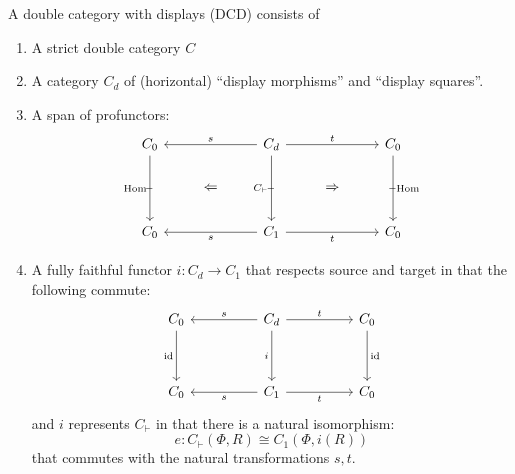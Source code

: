 \documentclass{llncs}
\begin{document}
\begin{definition}
  A double category with displays (DCD) consists of
  \begin{enumerate}
  \item A strict double category $C$
  \item A category $C_d$ of (horizontal) ``display morphisms'' and ``display squares''.
  \item A span of profunctors:
\[\begin{tikzcd}
	{C_0} && {C_d} && {C_0} \\
	& \Leftarrow && \Rightarrow \\
	{C_0} && {C_1} && {C_0}
	\arrow["{C_\vdash}"', "\shortmid"{marking}, from=1-3, to=3-3]
	\arrow["{\textrm{Hom}}", "\shortmid"{marking}, from=1-5, to=3-5]
	\arrow["{\textrm{Hom}}"', "\shortmid"{marking}, from=1-1, to=3-1]
	\arrow["s"', from=1-3, to=1-1]
	\arrow["t", from=1-3, to=1-5]
	\arrow["t"', from=3-3, to=3-5]
	\arrow["s", from=3-3, to=3-1]
\end{tikzcd}\]
\item A fully faithful functor $i : C_d \to C_1$ that respects source and target in that the following commute:
\[\begin{tikzcd}
	{C_0} && {C_d} && {C_0} \\
	\\
	{C_0} && {C_1} && {C_0}
	\arrow["i"', from=1-3, to=3-3]
	\arrow["\id", from=1-5, to=3-5]
	\arrow["\id"', from=1-1, to=3-1]
	\arrow["s"', from=1-3, to=1-1]
	\arrow["t", from=1-3, to=1-5]
	\arrow["t"', from=3-3, to=3-5]
	\arrow["s", from=3-3, to=3-1]
\end{tikzcd}\]
and $i$ represents $C_\vdash$ in that there is a natural isomorphism:
    \[ e : C_\vdash(\Phi, R) \cong C_1(\Phi, i(R)) \]
    that commutes with the natural transformations $s,t$.
  \end{enumerate}
\end{definition}
\end{document}

